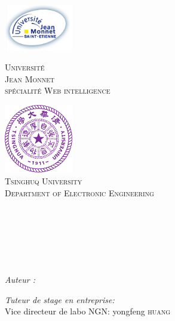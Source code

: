 
\begin{titlepage}

\begin{center}

\begin{minipage}[t]{0.48\textwidth}
  \begin{flushleft}
    \includegraphics [width=30mm]{images/logo-univ.png} \\[0.3cm]
    \begin{spacing}{1.1}
      \textsc{\LARGE Université\\ Jean Monnet \\ \large spécialité Web intelligence}
    \end{spacing}
  \end{flushleft}
\end{minipage}
\begin{minipage}[t]{0.5\textwidth}
  \begin{flushright}
    \includegraphics [width=30mm]{images/Tsinghua_University_Logo.png} \\[0.5cm]
    \textsc{\LARGE Tsinghuq University\\ \large Department of Electronic Engineering}
  \end{flushright}
\end{minipage}\\ [3.5ex]

\textsc{\Large \reportsubject}\\[0.1ex]
\HRule \\[0.4cm]
{\huge \bfseries \reporttitle}\\[0.2ex]
\HRule \\[10.5ex]

\begin{minipage}[t]{0.3\textwidth}
  \begin{flushleft} \large
    \emph{Auteur :}\\
    \reportauthor
  \end{flushleft}
\end{minipage}
\begin{minipage}[t]{0.6\textwidth}
  \begin{flushright} \large
    \emph{Tuteur de stage en entreprise:} \\
    Vice directeur de labo NGN: yongfeng \textsc{huang} \\
    

\end{flushright}
\end{minipage}
\end{center}
\end{titlepage}
